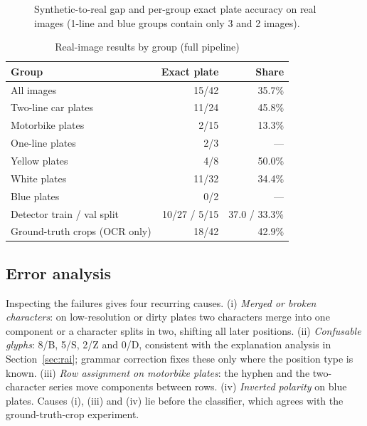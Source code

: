 \documentclass[conference]{IEEEtran}
\begin{document}
\begin{figure}[t]
\centering
{}
\caption{Synthetic-to-real gap and per-group exact plate accuracy on real images
(1-line and blue groups contain only 3 and 2 images).}
\label{fig:gap}
\end{figure}

\begin{table}[t]
\centering
\caption{Real-image results by group (full pipeline)}
\label{tab:groups}
\begin{tabular}{@{}lrr@{}}
\toprule
Group & Exact plate & Share \\
\midrule
All images & 15/42 & 35.7\% \\
Two-line car plates & 11/24 & 45.8\% \\
Motorbike plates & 2/15 & 13.3\% \\
One-line plates & 2/3 & --- \\
Yellow plates & 4/8 & 50.0\% \\
White plates & 11/32 & 34.4\% \\
Blue plates & 0/2 & --- \\
Detector train / val split & 10/27 / 5/15 & 37.0 / 33.3\% \\
\midrule
Ground-truth crops (OCR only) & 18/42 & 42.9\% \\
\bottomrule
\end{tabular}
\end{table}

\subsection{Error analysis}
Inspecting the failures gives four recurring causes. (i) \emph{Merged or broken
characters}: on low-resolution or dirty plates two characters merge into one
component or a character splits in two, shifting all later positions. (ii)
\emph{Confusable glyphs}: 8/B, 5/S, 2/Z and 0/D, consistent with the explanation
analysis in Section~\ref{sec:rai}; grammar correction fixes these only where the
position type is known. (iii) \emph{Row assignment on motorbike plates}: the
hyphen and the two-character series move components between rows. (iv)
\emph{Inverted polarity} on blue plates. Causes (i), (iii) and (iv) lie before
the classifier, which agrees with the ground-truth-crop experiment.
\end{document}
